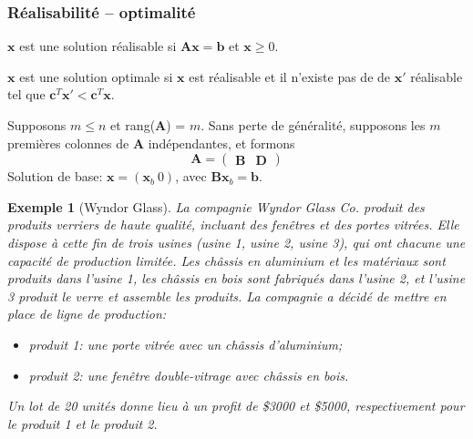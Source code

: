 \documentclass[usepdftitle=false]{beamer}
\def\bb{\boldsymbol{b}}
\def\bc{\boldsymbol{c}}
\def\bx{\boldsymbol{x}}
\def\bA{\boldsymbol{A}}
\def\bB{\boldsymbol{B}}
\def\bD{\boldsymbol{D}}
\newtheorem{exe}{Exemple}
\begin{document}
\begin{frame}
\frametitle{Réalisabilité -- optimalité}

$\bx$ est une solution réalisable si $\bA\bx = \bb$ et $\bx \geq 0$.

\mbox{}

$\bx$ est une solution optimale si $\bx$ est réalisable et il n'existe pas de de $\bx'$ réalisable tel que $\bc^T \bx' < \bc^T \bx$.

\mbox{}

Supposons $m \leq n$ et rang($\bA$) = $m$.
Sans perte de généralité, supposons les $m$ premières colonnes de $\bA$ indépendantes, et formons
\[
\bA =
\begin{pmatrix}
 \bB & \bD
\end{pmatrix}
\]
Solution de base: $\bx = (\bx_b \ 0)$, avec $\bB\bx_b = \bb$.

\end{frame}

\begin{frame}
\begin{exe}[Wyndor Glass]
\label{ex:wyndor}
La compagnie Wyndor Glass Co. produit des produits verriers de haute qualité, incluant des fenêtres et des portes vitrées.
Elle dispose à cette fin de trois usines (usine 1, usine 2, usine 3), qui ont chacune une capacité de production limitée.
Les châssis en aluminium et les matériaux sont produits dans l'usine 1, les châssis en bois sont fabriqués dans l'usine 2, et l'usine 3 produit le verre et assemble les produits.
La compagnie a décidé de mettre en place de ligne de production:
\begin{itemize}
\item
produit 1: une porte vitrée avec un châssis d'aluminium;
\item
produit 2: une fenêtre double-vitrage avec châssis en bois.
\end{itemize}

Un lot de 20 unités donne lieu à un profit de \$3000 et \$5000, respectivement pour le produit 1 et le produit 2.
\end{exe}

\end{frame}
\end{document}
